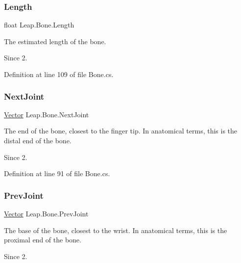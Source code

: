 \subsubsection{\texorpdfstring{Length}{Length}}
{\footnotesize\ttfamily float Leap.\+Bone.\+Length}



The estimated length of the bone. 

\begin{DoxySince}{Since}
2. 
\end{DoxySince}


Definition at line 109 of file Bone.\+cs.

\mbox{\label{class_leap_1_1_bone_ac0923c0228d11208289b81ff8ed208b7}} 
\subsubsection{\texorpdfstring{NextJoint}{NextJoint}}
{\footnotesize\ttfamily \mbox{\hyperlink{struct_leap_1_1_vector}{Vector}} Leap.\+Bone.\+Next\+Joint}



The end of the bone, closest to the finger tip. In anatomical terms, this is the distal end of the bone. 

\begin{DoxySince}{Since}
2. 
\end{DoxySince}


Definition at line 91 of file Bone.\+cs.

\mbox{\label{class_leap_1_1_bone_a9bf9d79aa10edd70baa3d27e8bac0730}} 
\subsubsection{\texorpdfstring{PrevJoint}{PrevJoint}}
{\footnotesize\ttfamily \mbox{\hyperlink{struct_leap_1_1_vector}{Vector}} Leap.\+Bone.\+Prev\+Joint}



The base of the bone, closest to the wrist. In anatomical terms, this is the proximal end of the bone. 

\begin{DoxySince}{Since}
2. 
\end{DoxySince}


